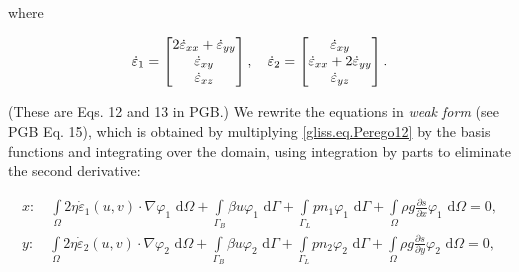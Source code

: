 \noindent
where

\begin{equation}
  \label{gliss.eq.Perego13}
  {{{\dot{\varepsilon }}}_{1}}=\left[ \begin{matrix}
      2{{{\dot{\varepsilon }}}_{xx}}+{{{\dot{\varepsilon }}}_{yy}} \\ 
      {{{\dot{\varepsilon }}}_{xy}} \\ 
      {{{\dot{\varepsilon }}}_{xz}} \\ 
    \end{matrix} \right], \quad
  {{{\dot{\varepsilon }}}_{2}}=\left[ \begin{matrix}
      {{{\dot{\varepsilon }}}_{xy}} \\ 
      {{{\dot{\varepsilon }}}_{xx}}+2{{{\dot{\varepsilon }}}_{yy}} \\ 
      {{{\dot{\varepsilon }}}_{yz}} \\ 
    \end{matrix} \right].  \\
\end{equation}

\noindent
(These are Eqs. 12 and 13 in PGB.)  We rewrite the equations in \textit{weak form} (see PGB Eq. 15), which
is obtained by multiplying \eqref{gliss.eq.Perego12} by the basis functions and integrating over the domain, using 
integration by parts to eliminate the second derivative:

\begin{equation}
  \label{gliss.eq.weak_form}
  \begin{split}
    x: \quad \int\limits_{\Omega } {2\eta {{{\dot{\varepsilon }}}_{1}}(u,v)\cdot \nabla {{\varphi }_{1}} \text{ d}\Omega }
      + \int\limits_{{\Gamma }_{B}} {\beta u{{\varphi }_{1}} \text{ d}\Gamma} 
      + \int\limits_{{\Gamma }_{L}} {p n_1 {{\varphi }_{1}} \text{ d}\Gamma}
      + \int\limits_{\Omega } {\rho g\frac{\partial s}{\partial x}{{\varphi }_{1}} \text{ d}\Omega}
      = \text{0},  \\
    y: \quad \int\limits_{\Omega } {2\eta {{{\dot{\varepsilon }}}_{2}}(u,v)\cdot \nabla {{\varphi }_{2}} \text{ d}\Omega }
      + \int\limits_{{\Gamma }_{B}} {\beta u{{\varphi }_{2}} \text{ d}\Gamma} 
      + \int\limits_{{\Gamma }_{L}} {p n_2 {{\varphi }_{2}} \text{ d}\Gamma}
      + \int\limits_{\Omega } {\rho g\frac{\partial s}{\partial y}{{\varphi }_{2}} \text{ d}\Omega}
      = \text{0},  \\
  \end{split}
\end{equation}

